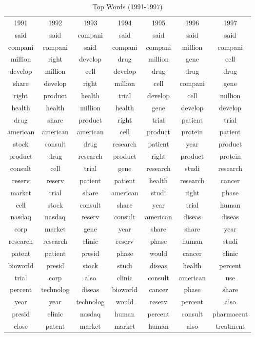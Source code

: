\begin{table}[p!]
\footnotesize
\begin{center}
\caption[Top Words (1991-1997)]{Top Words (1991-1997) \label{topwords1}}
\vspace{0.3in}
\begin{tabular}{ccccccc}
\hline 
\hline
1991 & 1992 & 1993 & 1994 & 1995 & 1996 & 1997 \\
said & said & compani & said & said & said & said \\
compani & compani & said & compani & compani & million & compani \\
million & right & develop & drug & million & gene & cell \\
develop & million & cell & develop & drug & drug & drug \\
share & develop & right & million & cell & compani & gene \\
right & product & health & trial & develop & cell & million \\
health & health & million & health & gene & develop & develop \\
drug & share & product & right & trial & patient & trial \\
american & american & american & cell & product & protein & patient \\
stock & consult & drug & research & patient & year & product \\
product & drug & research & product & right & product & protein \\
consult & cell & trial & gene & research & studi & research \\
reserv & reserv & patient & patient & health & research & cancer \\
market & trial & share & american & studi & right & phase \\
cell & stock & consult & share & year & trial & human \\
nasdaq & nasdaq & reserv & consult & american & diseas & diseas \\
corp & market & gene & year & share & share & year \\
research & research & clinic & reserv & phase & human & studi \\
patent & patient & presid & phase & would & cancer & clinic \\
bioworld & presid & stock & studi & diseas & health & percent \\
trial & corp & also & clinic & consult & american & use \\
percent & technolog & diseas & bioworld & cancer & phase & share \\
year & year & technolog & would & reserv & percent & also \\
presid & clinic & nasdaq & human & percent & consult & pharmaceut \\
close & patent & market & market & human & also & treatment \\
\hline
\end{tabular}
\end{center}
\end{table}

